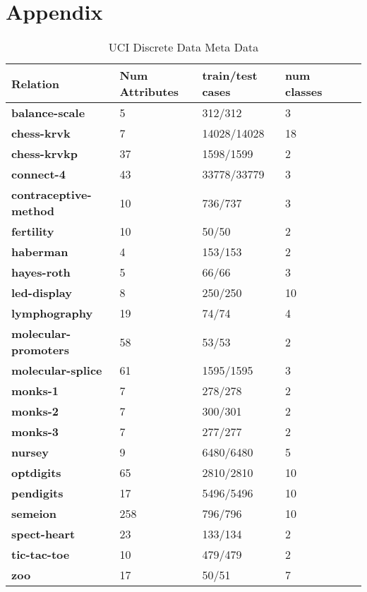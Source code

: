 \documentclass{cmppgr}
\begin{document}
\section{Appendix}
\begin{table}[!h]
  \centering
  \scriptsize
  \caption{UCI Discrete Data Meta Data}
  \begin{tabular}{|p{1.4cm}|p{1.4cm}|p{1.4cm}| p{1.4cm} |p{1cm}| p{1cm}|}
  \hline \bf Relation & \bf Num Attributes & \bf train/test cases & \bf num classes \\ [10pt]

  \hline \bf balance-scale & 5 & 312/312 & 3\\ [7pt]
  \hline \bf chess-krvk & 7 & 14028/14028 & 18\\ [7pt]
  \hline \bf chess-krvkp & 37 & 1598/1599 & 2\\ [7pt]
  \hline \bf connect-4 & 43 & 33778/33779 & 3\\ [7pt]
  \hline \bf contraceptive-method & 10 & 736/737 & 3\\ [7pt]
  \hline \bf fertility & 10 & 50/50 & 2\\ [7pt]
  \hline \bf haberman & 4 & 153/153 & 2\\ [7pt]
  \hline \bf hayes-roth & 5 & 66/66 & 3\\ [7pt]
  \hline \bf led-display & 8 & 250/250 & 10\\ [7pt]
  \hline \bf lymphography & 19 & 74/74 & 4\\ [7pt]
  \hline \bf molecular-promoters & 58 & 53/53 & 2\\ [7pt]
  \hline \bf molecular-splice & 61 & 1595/1595 & 3\\ [7pt]
  \hline \bf monks-1 & 7 & 278/278 & 2\\ [7pt]
  \hline \bf monks-2 & 7 & 300/301 & 2\\ [7pt]
  \hline \bf monks-3 & 7 & 277/277 & 2\\ [7pt]
  \hline \bf nursey & 9 & 6480/6480 & 5\\ [7pt]
  \hline \bf optdigits & 65 & 2810/2810 & 10\\ [7pt]
  \hline \bf pendigits & 17 & 5496/5496 & 10\\ [7pt]
  \hline \bf semeion & 258 & 796/796 & 10\\ [7pt]
  \hline \bf spect-heart & 23 & 133/134 & 2\\ [7pt]
  \hline \bf tic-tac-toe & 10 & 479/479 & 2\\ [7pt]
  \hline \bf zoo & 17 & 50/51 & 7\\ [7pt]
  \hline
  \end{tabular} \\

\end{table}
\end{document}
